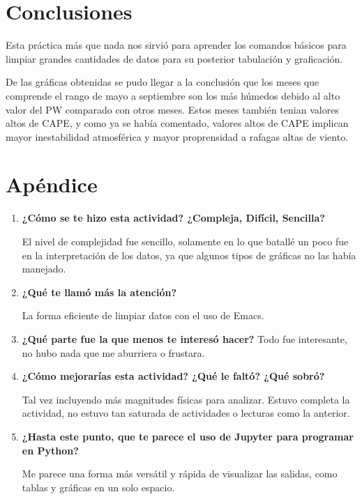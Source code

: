 \documentclass[a4paper]{article}
\begin{document}
\section{Conclusiones}

Esta práctica más que nada nos sirvió para aprender los comandos básicos para limpiar grandes cantidades de datos para su posterior tabulación y graficación. 

\noindent De las gráficas obtenidas se pudo llegar a la conclusión que los meses que comprende el rango de mayo a septiembre son los más húmedos debido al alto valor del PW comparado con otros meses. Estos meses también tenian valores altos de CAPE, y como ya se había comentado, valores altos de CAPE implican mayor inestabilidad atmosférica y mayor proprensidad a rafagas altas de viento.


\section{Apéndice}
\begin{enumerate}
\item \textbf{¿Cómo se te hizo esta actividad? ¿Compleja, Difícil, Sencilla?}

El nivel de complejidad fue sencillo, solamente en lo que batallé un poco fue en la interpretación de los datos, ya que algunos tipos de gráficas no las había manejado.

\item \textbf{¿Qué te llamó más la atención?}

La forma eficiente de limpiar datos con el uso de Emacs.
\item \textbf{¿Qué parte fue la que menos te interesó hacer?}
Todo fue interesante, no hubo nada que me aburriera o frustara.

\item \textbf{¿Cómo mejorarías esta actividad? ¿Qué le faltó? ¿Qué sobró?}

Tal vez incluyendo más magnitudes físicas para analizar. Estuvo completa la actividad, no estuvo tan saturada de actividades o lecturas como la anterior. 

\item \textbf{¿Hasta este punto, que te parece el uso de Jupyter para programar en Python?}

Me parece una forma más versátil y rápida de visualizar las salidas, como tablas y gráficas en un solo espacio.

\end{enumerate}
\end{document}
